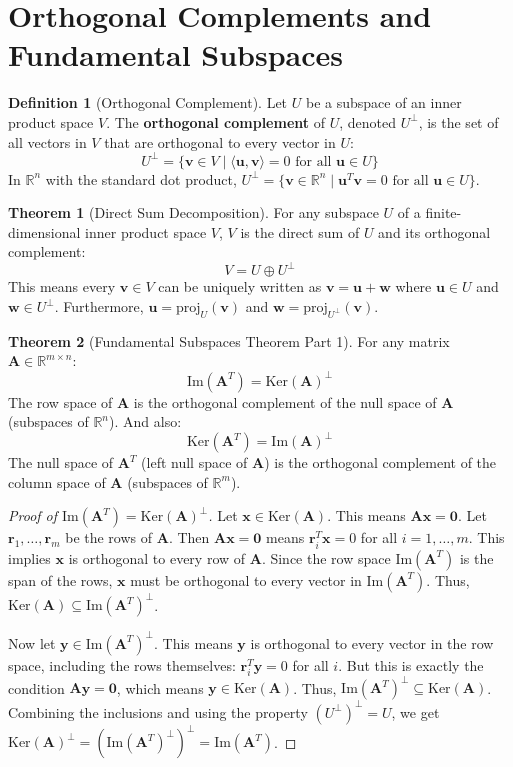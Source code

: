 \documentclass[12pt, letterpaper]{article}
\theoremstyle{definition}
\newtheorem{definition}{Definition}[section]
\newtheorem{theorem}{Theorem}[section]
\newcommand{\R}{\mathbb{R}}
\newcommand{\mat}[1]{\mathbf{#1}} %
\newcommand{\vect}[1]{\mathbf{#1}} %
\renewcommand{\v}{\vect{v}} %
\newcommand{\uvec}{\vect{u}} %
\newcommand{\x}{\vect{x}} %
\newcommand{\y}{\vect{y}} %
\newcommand{\w}{\vect{w}} %
\newcommand{\im}{\text{Im}}
\newcommand{\Ker}{\text{Ker}}
\begin{document}
\section{Orthogonal Complements and Fundamental Subspaces}

\begin{definition}[Orthogonal Complement]
Let $U$ be a subspace of an inner product space $V$. The \textbf{orthogonal complement} of $U$, denoted $U^\perp$, is the set of all vectors in $V$ that are orthogonal to every vector in $U$:
\[ U^\perp = \{\v \in V \mid \langle \uvec, \v \rangle = 0 \text{ for all } \uvec \in U\} \]
In $\R^n$ with the standard dot product, $U^\perp = \{\v \in \R^n \mid \uvec^T \v = 0 \text{ for all } \uvec \in U\}$.
\end{definition}

\begin{theorem}[Direct Sum Decomposition]
For any subspace $U$ of a finite-dimensional inner product space $V$, $V$ is the direct sum of $U$ and its orthogonal complement:
\[ V = U \oplus U^\perp \]
This means every $\v \in V$ can be uniquely written as $\v = \uvec + \w$ where $\uvec \in U$ and $\w \in U^\perp$. Furthermore, $\uvec = \text{proj}_U(\v)$ and $\w = \text{proj}_{U^\perp}(\v)$.
\end{theorem}

\begin{theorem}[Fundamental Subspaces Theorem Part 1]
For any matrix $\mat{A} \in \R^{m \times n}$:
\[ \im(\mat{A}^T) = \Ker(\mat{A})^\perp \]
The row space of $\mat{A}$ is the orthogonal complement of the null space of $\mat{A}$ (subspaces of $\R^n$).
And also:
\[ \Ker(\mat{A}^T) = \im(\mat{A})^\perp \]
The null space of $\mat{A}^T$ (left null space of $\mat{A}$) is the orthogonal complement of the column space of $\mat{A}$ (subspaces of $\R^m$).
\end{theorem}
\begin{proof}[Proof of $\im(\mat{A}^T) = \Ker(\mat{A})^\perp$]
Let $\x \in \Ker(\mat{A})$. This means $\mat{A}\x = \vect{0}$. Let $\vect{r}_1, \dots, \vect{r}_m$ be the rows of $\mat{A}$. Then $\mat{A}\x = \vect{0}$ means $\vect{r}_i^T \x = 0$ for all $i=1, \dots, m$. This implies $\x$ is orthogonal to every row of $\mat{A}$. Since the row space $\im(\mat{A}^T)$ is the span of the rows, $\x$ must be orthogonal to every vector in $\im(\mat{A}^T)$. Thus, $\Ker(\mat{A}) \subseteq \im(\mat{A}^T)^\perp$.

Now let $\y \in \im(\mat{A}^T)^\perp$. This means $\y$ is orthogonal to every vector in the row space, including the rows themselves: $\vect{r}_i^T \y = 0$ for all $i$. But this is exactly the condition $\mat{A}\y = \vect{0}$, which means $\y \in \Ker(\mat{A})$. Thus, $\im(\mat{A}^T)^\perp \subseteq \Ker(\mat{A})$.
Combining the inclusions and using the property $(U^\perp)^\perp = U$, we get $\Ker(\mat{A})^\perp = (\im(\mat{A}^T)^\perp)^\perp = \im(\mat{A}^T)$.
\end{proof}
\end{document}
